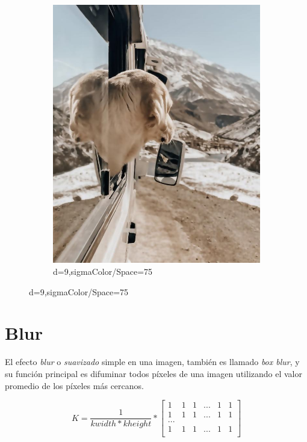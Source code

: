 \documentclass[a4paper, 12pt]{article}
\begin{document}
\begin{figure}[!ht]
\begin{subfigure}{0.4\textwidth}
        \includegraphics[width=\textwidth]{img/dog-bilateral.jpg}
        \caption{d=9,sigmaColor/Space=75}
    \end{subfigure}
\end{figure}

\section{Blur}
El efecto \emph{blur} o \emph{suavizado} simple en una imagen, también es llamado \emph{box blur}, y su función principal es difuminar todos píxeles de una imagen utilizando el valor promedio de los píxeles más cercanos.

\begin{equation}
    K = \frac{1}{kwidth*kheight}
    *
    \begin{bmatrix}
        1 & 1 & 1 & ... & 1 & 1 \\
        1 & 1 & 1 & ... & 1 & 1 \\
        ...                     \\
        1 & 1 & 1 & ... & 1 & 1 \\
    \end{bmatrix}
\end{equation}
\end{document}
